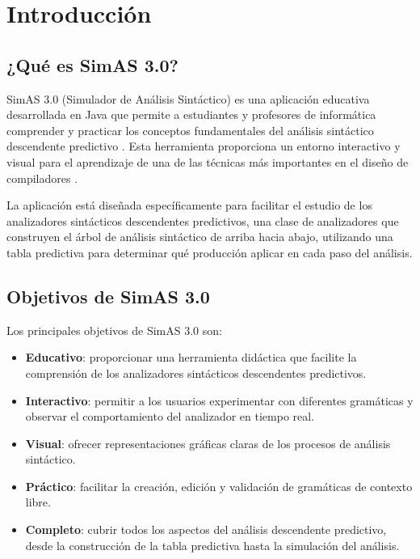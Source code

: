 \chapter{Introducción}

\section{¿Qué es SimAS 3.0?}

SimAS 3.0 (Simulador de Análisis Sintáctico) es una aplicación educativa desarrollada en Java que permite a estudiantes y profesores de informática comprender y practicar los conceptos fundamentales del análisis sintáctico descendente predictivo \cite{ll1}. Esta herramienta proporciona un entorno interactivo y visual para el aprendizaje de una de las técnicas más importantes en el diseño de compiladores \cite{aho2008}.

La aplicación está diseñada específicamente para facilitar el estudio de los analizadores sintácticos descendentes predictivos, una clase de analizadores que construyen el árbol de análisis sintáctico de arriba hacia abajo, utilizando una tabla predictiva para determinar qué producción aplicar en cada paso del análisis.

\section{Objetivos de SimAS 3.0}

Los principales objetivos de SimAS 3.0 son:

\begin{itemize}
    \item \textbf{Educativo}: proporcionar una herramienta didáctica que facilite la comprensión de los analizadores sintácticos descendentes predictivos.
    \item \textbf{Interactivo}: permitir a los usuarios experimentar con diferentes gramáticas y observar el comportamiento del analizador en tiempo real.
    \item \textbf{Visual}: ofrecer representaciones gráficas claras de los procesos de análisis sintáctico.
    \item \textbf{Práctico}: facilitar la creación, edición y validación de gramáticas de contexto libre.
    \item \textbf{Completo}: cubrir todos los aspectos del análisis descendente predictivo, desde la construcción de la tabla predictiva hasta la simulación del análisis.
\end{itemize}

